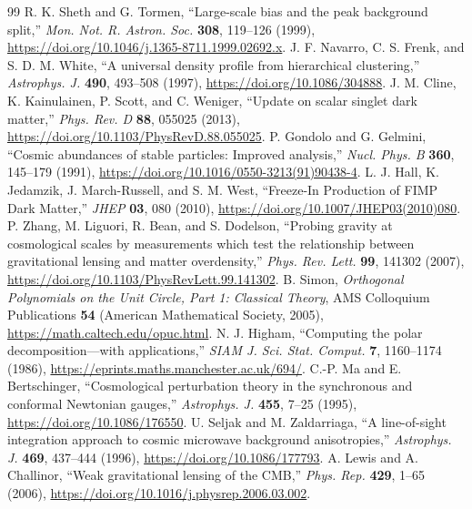 \begin{thebibliography}{99}
 R. K. Sheth and G. Tormen, ``Large-scale bias and the peak background split,'' \emph{Mon. Not. R. Astron. Soc.} \textbf{308}, 119--126 (1999), \url{https://doi.org/10.1046/j.1365-8711.1999.02692.x}.
 J. F. Navarro, C. S. Frenk, and S. D. M. White, ``A universal density profile from hierarchical clustering,'' \emph{Astrophys. J.} \textbf{490}, 493--508 (1997), \url{https://doi.org/10.1086/304888}.
 J. M. Cline, K. Kainulainen, P. Scott, and C. Weniger, ``Update on scalar singlet dark matter,'' \emph{Phys. Rev. D} \textbf{88}, 055025 (2013), \url{https://doi.org/10.1103/PhysRevD.88.055025}.
 P. Gondolo and G. Gelmini, ``Cosmic abundances of stable particles: Improved analysis,'' \emph{Nucl. Phys. B} \textbf{360}, 145--179 (1991), \url{https://doi.org/10.1016/0550-3213(91)90438-4}.
 L. J. Hall, K. Jedamzik, J. March-Russell, and S. M. West, ``Freeze-In Production of FIMP Dark Matter,'' \emph{JHEP} \textbf{03}, 080 (2010), \url{https://doi.org/10.1007/JHEP03(2010)080}.
 P. Zhang, M. Liguori, R. Bean, and S. Dodelson, ``Probing gravity at cosmological scales by measurements which test the relationship between gravitational lensing and matter overdensity,'' \emph{Phys. Rev. Lett.} \textbf{99}, 141302 (2007), \url{https://doi.org/10.1103/PhysRevLett.99.141302}.
 B. Simon, \emph{Orthogonal Polynomials on the Unit Circle, Part 1: Classical Theory}, AMS Colloquium Publications \textbf{54} (American Mathematical Society, 2005), \url{https://math.caltech.edu/opuc.html}.
 N. J. Higham, ``Computing the polar decomposition---with applications,'' \emph{SIAM J. Sci. Stat. Comput.} \textbf{7}, 1160--1174 (1986), \url{https://eprints.maths.manchester.ac.uk/694/}.
 C.-P. Ma and E. Bertschinger, ``Cosmological perturbation theory in the synchronous and conformal Newtonian gauges,'' \emph{Astrophys. J.} \textbf{455}, 7--25 (1995), \url{https://doi.org/10.1086/176550}.
 U. Seljak and M. Zaldarriaga, ``A line-of-sight integration approach to cosmic microwave background anisotropies,'' \emph{Astrophys. J.} \textbf{469}, 437--444 (1996), \url{https://doi.org/10.1086/177793}.
 A. Lewis and A. Challinor, ``Weak gravitational lensing of the CMB,'' \emph{Phys. Rep.} \textbf{429}, 1--65 (2006), \url{https://doi.org/10.1016/j.physrep.2006.03.002}.
\end{thebibliography}
